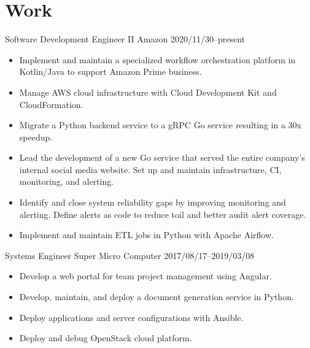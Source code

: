 \section{Work}

\begin{experiencelist}
    \experienceitem
        {Software Development Engineer II}
        {Amazon}
        {2020/11/30--present}
    \begin{itemize}[noitemsep, topsep=0pt]
        \item
            Implement and maintain a specialized workflow orchestration
            platform in Kotlin/Java to support Amazon Prime business.
        \item
            Manage AWS cloud infrastructure with Cloud Development Kit and
            CloudFormation.
    \end{itemize}

    \begin{itemize}[noitemsep, topsep=0pt]
        \item
            Migrate a Python backend service to a gRPC Go service resulting in
            a 30x speedup.
        \item
            Lead the development of a new Go service that served the entire
            company's internal social media website. Set up and maintain
            infrastructure, CI, monitoring, and alerting.
        \item
            Identify and close system reliability gaps by improving monitoring
            and alerting. Define alerts as code to reduce toil and better audit
            alert coverage.
        \item Implement and maintain ETL jobs in Python with Apache Airflow.
    \end{itemize}

    \experienceitem
        {Systems Engineer}
        {Super Micro Computer}
        {2017/08/17--2019/03/08}
    \begin{itemize}[noitemsep, topsep=0pt]
        \item Develop a web portal for team project management using Angular.
        \item
            Develop, maintain, and deploy a document generation service in
            Python.
        \item Deploy applications and server configurations with Ansible.
        \item Deploy and debug OpenStack cloud platform.
    \end{itemize}
\end{experiencelist}
